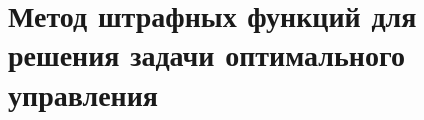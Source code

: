 \section{Метод штрафных функций для решения задачи оптимального управления}
\label{sec:ch3:sec3}

%
%

